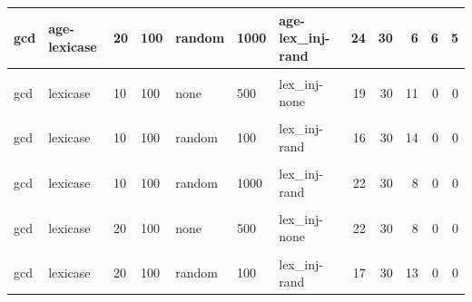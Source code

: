 \documentclass[
]{book}
\begin{document}
\begin{table}
\begin{tabular}{l|l|l|l|l|l|l|r|r|r|r|r}
\hline
gcd & age-lexicase & 20 & 100 & random & 1000 & age-lex\_inj-rand & 24 & 30 & 6 & 6 & 5\\
\hline
\cellcolor{gray!6}{gcd} & \cellcolor{gray!6}{lexicase} & \cellcolor{gray!6}{10} & \cellcolor{gray!6}{100} & \cellcolor{gray!6}{none} & \cellcolor{gray!6}{100} & \cellcolor{gray!6}{lex\_inj-none} & \cellcolor{gray!6}{18} & \cellcolor{gray!6}{30} & \cellcolor{gray!6}{12} & \cellcolor{gray!6}{0} & \cellcolor{gray!6}{0}\\
\hline
gcd & lexicase & 10 & 100 & none & 500 & lex\_inj-none & 19 & 30 & 11 & 0 & 0\\
\hline
\cellcolor{gray!6}{gcd} & \cellcolor{gray!6}{lexicase} & \cellcolor{gray!6}{10} & \cellcolor{gray!6}{100} & \cellcolor{gray!6}{none} & \cellcolor{gray!6}{1000} & \cellcolor{gray!6}{lex\_inj-none} & \cellcolor{gray!6}{21} & \cellcolor{gray!6}{30} & \cellcolor{gray!6}{9} & \cellcolor{gray!6}{0} & \cellcolor{gray!6}{0}\\
\hline
gcd & lexicase & 10 & 100 & random & 100 & lex\_inj-rand & 16 & 30 & 14 & 0 & 0\\
\hline
\cellcolor{gray!6}{gcd} & \cellcolor{gray!6}{lexicase} & \cellcolor{gray!6}{10} & \cellcolor{gray!6}{100} & \cellcolor{gray!6}{random} & \cellcolor{gray!6}{500} & \cellcolor{gray!6}{lex\_inj-rand} & \cellcolor{gray!6}{22} & \cellcolor{gray!6}{30} & \cellcolor{gray!6}{8} & \cellcolor{gray!6}{0} & \cellcolor{gray!6}{0}\\
\hline
gcd & lexicase & 10 & 100 & random & 1000 & lex\_inj-rand & 22 & 30 & 8 & 0 & 0\\
\hline
\cellcolor{gray!6}{gcd} & \cellcolor{gray!6}{lexicase} & \cellcolor{gray!6}{20} & \cellcolor{gray!6}{100} & \cellcolor{gray!6}{none} & \cellcolor{gray!6}{100} & \cellcolor{gray!6}{lex\_inj-none} & \cellcolor{gray!6}{22} & \cellcolor{gray!6}{30} & \cellcolor{gray!6}{8} & \cellcolor{gray!6}{0} & \cellcolor{gray!6}{0}\\
\hline
gcd & lexicase & 20 & 100 & none & 500 & lex\_inj-none & 22 & 30 & 8 & 0 & 0\\
\hline
\cellcolor{gray!6}{gcd} & \cellcolor{gray!6}{lexicase} & \cellcolor{gray!6}{20} & \cellcolor{gray!6}{100} & \cellcolor{gray!6}{none} & \cellcolor{gray!6}{1000} & \cellcolor{gray!6}{lex\_inj-none} & \cellcolor{gray!6}{19} & \cellcolor{gray!6}{30} & \cellcolor{gray!6}{11} & \cellcolor{gray!6}{0} & \cellcolor{gray!6}{0}\\
\hline
gcd & lexicase & 20 & 100 & random & 100 & lex\_inj-rand & 17 & 30 & 13 & 0 & 0\\

\end{tabular}
\end{table}
\end{document}
